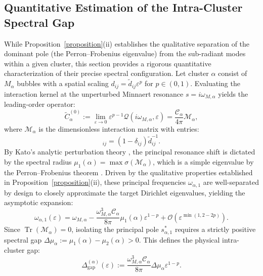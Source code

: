 \documentclass[11pt,a4paper]{article}
\numberwithin{equation}{section}
\begin{document}
\subsection{Quantitative Estimation of the Intra-Cluster Spectral Gap}
\noindent
While Proposition~\ref{proposition}(ii) establishes the qualitative separation of the dominant pole (the Perron--Frobenius eigenvalue) from the sub-radiant modes within a given cluster, this section provides a rigorous quantitative characterization of their precise spectral configuration.
\newline
Let cluster $\alpha$ consist of $M_\alpha$ bubbles with a spatial scaling $d_{ij} = \widetilde{d}_{ij} \varepsilon^p$ for $p \in (0,1)$. Evaluating the interaction kernel at the unperturbed Minnaert resonance $s = i\omega_{M,\alpha}$ yields the leading-order operator:
\begin{equation}
    \widetilde{C}_\alpha^{(0)} := \lim_{\varepsilon \to 0} \varepsilon^{p-1} \mathcal{Q}(i\omega_{M,\alpha}, \varepsilon) = \frac{\mathcal{C}_\alpha}{4\pi} \mathcal{M}_\alpha,
\end{equation}
where $\mathcal{M}_\alpha$ is the dimensionless interaction matrix with entries:
\begin{equation}
    [\mathcal{M}_\alpha]_{ij} = (1 - \delta_{ij})\widetilde{d}_{ij}^{-1}.
\end{equation}
By Kato's analytic perturbation theory \cite{kato1995perturbation}, the principal resonance shift is dictated by the spectral radius $\mu_1(\alpha) = \max \sigma(\mathcal{M}_\alpha)$, which is a simple eigenvalue by the Perron--Frobenius theorem \cite[Ch. 8]{la1}. Driven by the qualitative properties established in Proposition~\ref{proposition}(ii), these principal frequencies $\omega_{\alpha, 1}$ are well-separated by design to closely approximate the target Dirichlet eigenvalues, yielding the asymptotic expansion:
\begin{equation} \label{eq:fine_shift}
    \omega_{\alpha, 1}(\varepsilon) = \omega_{M,\alpha} - \frac{\omega_{M,\alpha}^3 \mathcal{C}_\alpha}{8\pi} \mu_1(\alpha) \varepsilon^{1-p} + \mathcal{O}(\varepsilon^{\min(1, 2-2p)}).
\end{equation}
Since $\operatorname{Tr}(\mathcal{M}_\alpha) = 0$, isolating the principal pole $s_{\alpha, 1}^\ast$ requires a strictly positive spectral gap $\Delta\mu_\alpha := \mu_1(\alpha) - \mu_2(\alpha) > 0$. This defines the physical intra-cluster gap:
\begin{equation}
    \Delta_{\text{gap}}^{(\alpha)}(\varepsilon) := \frac{\omega_{M,\alpha}^3 \mathcal{C}_\alpha}{8\pi} \Delta\mu_\alpha \varepsilon^{1-p}.
\end{equation}
\end{document}

